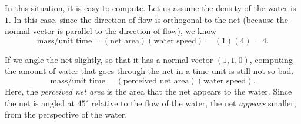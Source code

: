 In this situation, it is easy to compute.  Let us assume
the density of the water is $1$.  In this case, since the direction
of flow is orthogonal to the net (because the normal vector is parallel
to the direction of flow), we know
\[
	\text{mass}/\text{unit time} = (\text{net area})
	(\text{water speed})=(1)(4)=4.
\]

If we angle the net slightly, so that it has a normal vector
$(1,1,0)$, computing the amount of water that goes through
the net in a time unit is still not so bad.
\[
	\text{mass}/\text{unit time} = (\text{perceived net area})
	(\text{water speed}).
\]
Here, the \emph{perceived net area} is the area that the net appears to
the water.  Since the net is angled at $45^\circ$ relative to the flow
of the water, the net \emph{appears} smaller, from the perspective of the water.


